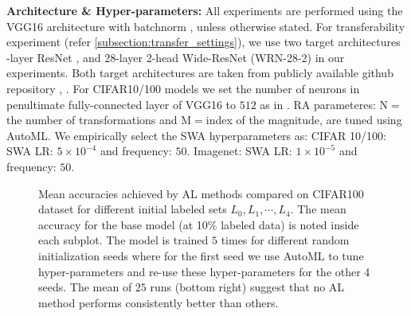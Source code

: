 \documentclass[10pt,twocolumn,letterpaper]{article}
\begin{document}
\noindent \textbf{Architecture \& Hyper-parameters: } All experiments are performed using the VGG16 architecture \cite{vgg16_simonyan2014very} with batchnorm \cite{batchnorm_ioffe2015batch}, unless otherwise stated. For transferability experiment (refer \cref{subsection:transfer_settings}), we use two target architectures -layer ResNet \cite{resnet_he2016deep}, and 28-layer 2-head Wide-ResNet (WRN-28-2) \cite{wide_resnet_zagoruyko2016wide} in our experiments. Both target architectures are taken from publicly available github repository  \cite{rn18_github}, \cite{wrn_Github}.
For CIFAR10/100 models we set the number of neurons in penultimate fully-connected layer of VGG16 to $512$ as in \cite{rn18_github}. RA parameteres: N$=$the number of transformations and M$=$index of the magnitude, are tuned using AutoML. We empirically select the SWA hyperparameters as: CIFAR 10/100: SWA LR: $5\times10^{-4}$ and frequency: $50$. Imagenet: SWA LR: $1\times10^{-5}$ and frequency: $50$. 




















\begin{figure*}
\begin{center}
  \vspace{-2em}
\end{center}
    \caption{Mean accuracies achieved by AL methods compared on CIFAR100 dataset for different initial labeled sets $L_{0}, L_{1}, \cdots, L_{4}$. The mean accuracy for the base model (at 10\% labeled data) is noted inside each subplot. The model is trained $5$ times for different random initialization seeds where for the first seed we use AutoML to tune hyper-parameters and re-use these hyper-parameters for the other 4 seeds. The mean of $25$ runs (bottom right) suggest that no AL method performs consistently better than others.}
    
\label{fig:cifar_five_lSets_stats_cif100}
  \vspace{-1em}
\end{figure*}
\end{document}
